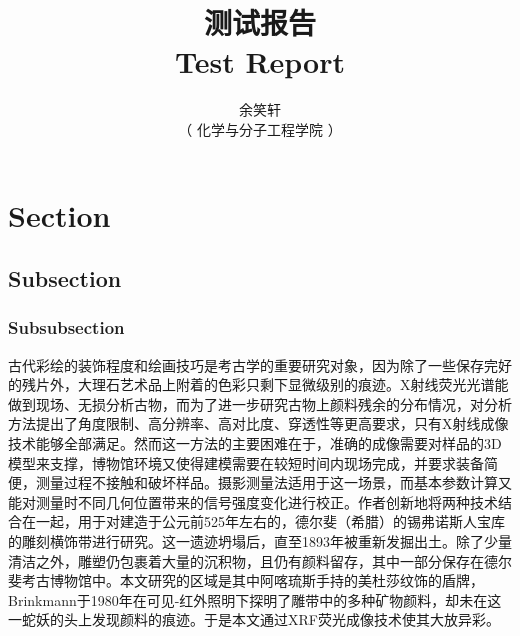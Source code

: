 \documentclass[UTF8,a4paper,fontset=none]{ctexart}
\title{
    {\huge {\color[rgb]{0.15234375,0.19140625,0.4921875}\heiti 测试报告}}\\%
    {\huge \color[rgb]{0.15234375,0.19140625,0.4921875}\fontspec{Arial} Test Report}\\%
}
\author{
    \fangsong 余笑轩\\%
    \fangsong （ 化学与分子工程学院\qquad 1900011816 ）%
}
\date{}
\begin{document}
    {}
    {}
    {}
    \maketitle
    \section{Section}
    \subsection{Subsection}
    \subsubsection{Subsubsection}
    古代彩绘的装饰程度和绘画技巧是考古学的重要研究对象，因为除了一些保存完好的残片外，大理石艺术品上附着的色彩只剩下显微级别的痕迹。X射线荧光光谱能做到现场、无损分析古物，而为了进一步研究古物上颜料残余的分布情况，对分析方法提出了角度限制、高分辨率、高对比度、穿透性等更高要求，只有X射线成像技术能够全部满足。然而这一方法的主要困难在于，准确的成像需要对样品的3D模型来支撑，博物馆环境又使得建模需要在较短时间内现场完成，并要求装备简便，测量过程不接触和破坏样品。摄影测量法适用于这一场景，而基本参数计算又能对测量时不同几何位置带来的信号强度变化进行校正。作者创新地将两种技术结合在一起，用于对建造于公元前525年左右的，德尔斐（希腊）的锡弗诺斯人宝库的雕刻横饰带进行研究。这一遗迹坍塌后，直至1893年被重新发掘出土。除了少量清洁之外，雕塑仍包裹着大量的沉积物，且仍有颜料留存，其中一部分保存在德尔斐考古博物馆中。本文研究的区域是其中阿喀琉斯手持的美杜莎纹饰的盾牌，Brinkmann于1980年在可见-红外照明下探明了雕带中的多种矿物颜料，却未在这一蛇妖的头上发现颜料的痕迹。于是本文通过XRF荧光成像技术使其大放异彩。
    \clearpage
\end{document}
